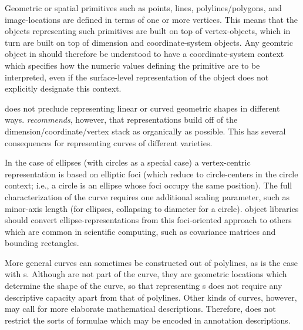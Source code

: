 {\begin{description}
Geometric or spatial primitives such as points, lines, 
polylines/polygons, and image-locations are  
defined in terms of one or more vertices.  
This means that the objects representing such 
primitives are built on top of vertex-objects, 
which in turn are built on top of dimension 
and coordinate-system objects.  Any geomtric 
object in \AXFI{} should therefore be understood 
to have a coordinate-system context which specifies 
how the numeric values defining the primitive 
are to be interpreted, even if the surface-level 
representation of the object does not explicitly 
designate this context. 

\item[Circles, Ellipses, and Curves]  
\label{ph:curves}
\lAXFI{} does not preclude representing linear or curved 
geometric shapes in different ways.  \lAXFI{} 
\textit{recommends}, however, that 
representations build off of the dimension/coordinate/vertex 
stack as organically as possible.  This has several 
consequences for representing curves of different 
varieties.  

In the case of ellipses (with circles as a special case) 
a vertex-centric representation is based on elliptic 
foci (which reduce to circle-centers in the circle 
context; i.e., a circle is an ellipse whose foci occupy 
the same position).  The full characterization of 
the curve requires one additional scaling parameter, 
such as minor-axis length (for ellipses, collapsing 
to diameter for a circle).  \lAXFI{} object libraries  
should convert ellipse-representations from 
this foci-oriented approach to others which are 
common in scientific computing, such as covariance matrices 
and bounding rectangles.  

More general curves can sometimes be constructed out 
of polylines, as is the case with 
\BSPLINE{}s.  Although \BSPLINE{}  
are not part of the curve, they are geometric 
locations which determine the shape of the curve, 
so that representing \BSPLINE{}s does not require 
any descriptive capacity apart from that of 
polylines.  Other kinds of curves, however, 
may call for more elaborate mathematical 
descriptions.  Therefore, \AXFI{} does not 
restrict the sorts of formulae which may be 
encoded in annotation descriptions.


\end{description}}
